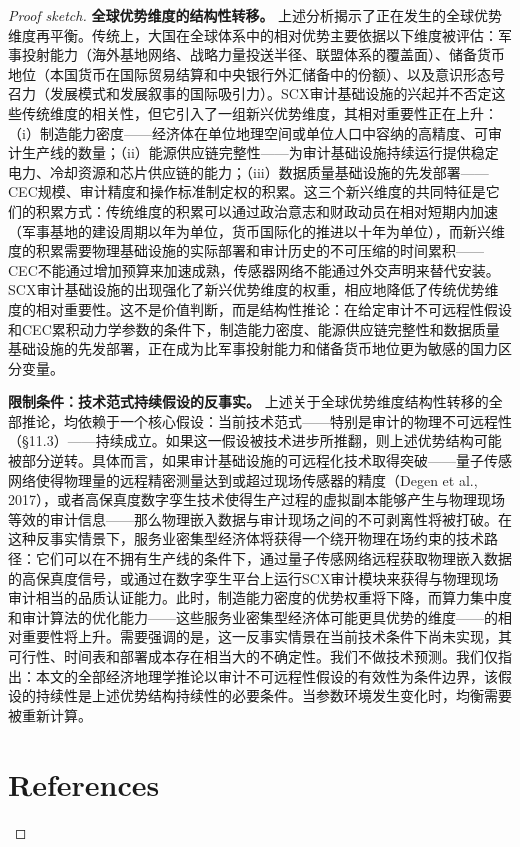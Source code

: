 \documentclass[12pt,a4paper]{ctexart}
\theoremstyle{definition}
\theoremstyle{remark}
\begin{document}
\begin{proof}[Proof sketch]
\textbf{全球优势维度的结构性转移。} 上述分析揭示了正在发生的全球优势维度再平衡。传统上，大国在全球体系中的相对优势主要依据以下维度被评估：军事投射能力（海外基地网络、战略力量投送半径、联盟体系的覆盖面）、储备货币地位（本国货币在国际贸易结算和中央银行外汇储备中的份额）、以及意识形态号召力（发展模式和发展叙事的国际吸引力）。SCX审计基础设施的兴起并不否定这些传统维度的相关性，但它引入了一组新兴优势维度，其相对重要性正在上升：（i）制造能力密度——经济体在单位地理空间或单位人口中容纳的高精度、可审计生产线的数量；（ii）能源供应链完整性——为审计基础设施持续运行提供稳定电力、冷却资源和芯片供应链的能力；（iii）数据质量基础设施的先发部署——CEC规模、审计精度和操作标准制定权的积累。这三个新兴维度的共同特征是它们的积累方式：传统维度的积累可以通过政治意志和财政动员在相对短期内加速（军事基地的建设周期以年为单位，货币国际化的推进以十年为单位），而新兴维度的积累需要物理基础设施的实际部署和审计历史的不可压缩的时间累积——CEC不能通过增加预算来加速成熟，传感器网络不能通过外交声明来替代安装。SCX审计基础设施的出现强化了新兴优势维度的权重，相应地降低了传统优势维度的相对重要性。这不是价值判断，而是结构性推论：在给定审计不可远程性假设和CEC累积动力学参数的条件下，制造能力密度、能源供应链完整性和数据质量基础设施的先发部署，正在成为比军事投射能力和储备货币地位更为敏感的国力区分变量。

\textbf{限制条件：技术范式持续假设的反事实。} 上述关于全球优势维度结构性转移的全部推论，均依赖于一个核心假设：当前技术范式——特别是审计的物理不可远程性（§11.3）——持续成立。如果这一假设被技术进步所推翻，则上述优势结构可能被部分逆转。具体而言，如果审计基础设施的可远程化技术取得突破——量子传感网络使得物理量的远程精密测量达到或超过现场传感器的精度（Degen et al., 2017），或者高保真度数字孪生技术使得生产过程的虚拟副本能够产生与物理现场等效的审计信息——那么物理嵌入数据与审计现场之间的不可剥离性将被打破。在这种反事实情景下，服务业密集型经济体将获得一个绕开物理在场约束的技术路径：它们可以在不拥有生产线的条件下，通过量子传感网络远程获取物理嵌入数据的高保真度信号，或通过在数字孪生平台上运行SCX审计模块来获得与物理现场审计相当的品质认证能力。此时，制造能力密度的优势权重将下降，而算力集中度和审计算法的优化能力——这些服务业密集型经济体可能更具优势的维度——的相对重要性将上升。需要强调的是，这一反事实情景在当前技术条件下尚未实现，其可行性、时间表和部署成本存在相当大的不确定性。我们不做技术预测。我们仅指出：本文的全部经济地理学推论以审计不可远程性假设的有效性为条件边界，该假设的持续性是上述优势结构持续性的必要条件。当参数环境发生变化时，均衡需要被重新计算。


\section*{References}


\end{proof}
\end{document}

